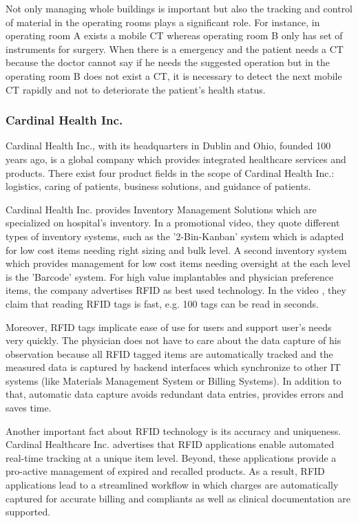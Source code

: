 Not only managing whole buildings is important but also the tracking and control of material in the operating rooms plays a significant role. For instance, in operating room A exists a mobile \ac{CT} whereas operating room B only has set of instruments for surgery. When there is a emergency and the patient needs a CT because the doctor cannot say if he needs the suggested operation but in the operating room B does not exist a CT, it is necessary to detect the next mobile CT rapidly and not to deteriorate the patient's health status. 

\subsubsection{Cardinal Health Inc.} \label{inventory}

Cardinal Health Inc., with its headquarters in Dublin and Ohio, founded 100 years ago,  \cite{cardinal_web} is a global company which provides integrated healthcare services and products. There exist four product fields in the scope of Cardinal Health Inc.: logistics, caring of patients, business solutions, and guidance of patients.

Cardinal Health Inc. provides Inventory Management Solutions \cite{cardinal_video} which are specialized on hospital's inventory. In a promotional video, they quote different types of inventory systems, such as the '2-Bin-Kanban' system which is adapted for low cost items needing right sizing and bulk level. A second inventory system which provides management for low cost items needing oversight at the each level is the 'Barcode' system. For high value implantables and physician preference items, the company advertises RFID as best used technology. In the video \cite{cardinal_video}, they claim that reading RFID tags is fast, e.g. 100 tags can be read in seconds. 

Moreover, RFID tags implicate ease of use for users and support user's needs very quickly. The physician does not have to care about the data capture of his observation because all RFID tagged items are automatically tracked and the measured data is captured by backend interfaces which synchronize to other IT systems (like Materials Management System or Billing Systems). In addition to that, automatic data capture avoids redundant data entries, provides errors and saves time.

Another important fact about RFID technology is its accuracy and uniqueness. Cardinal Healthcare Inc. advertises that RFID applications enable automated real-time tracking at a unique item level. Beyond, these applications provide a pro-active management of expired and recalled products. As a result, RFID applications lead to a streamlined workflow in which charges are automatically captured for accurate billing and compliants as well as clinical documentation are supported. 

